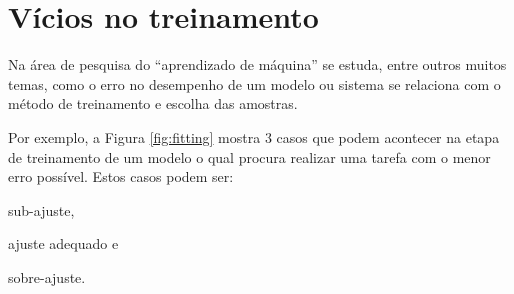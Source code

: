 
\section{Vícios no treinamento}
\label{sec:sec-under-over-fitting}


Na área de pesquisa do ``aprendizado de máquina'' se estuda, entre outros muitos temas, 
como o erro no desempenho de um modelo ou sistema 
se relaciona com o método de treinamento e escolha das amostras.

Por exemplo, a Figura \ref{fig:fitting} mostra 3 casos que podem acontecer na 
etapa de treinamento de um modelo o qual procura realizar uma tarefa com o menor erro possível.
Estos casos podem ser: 
\begin{inparaitem}
\item sub-ajuste, 
\item ajuste adequado e 
\item sobre-ajuste.
\end{inparaitem}
